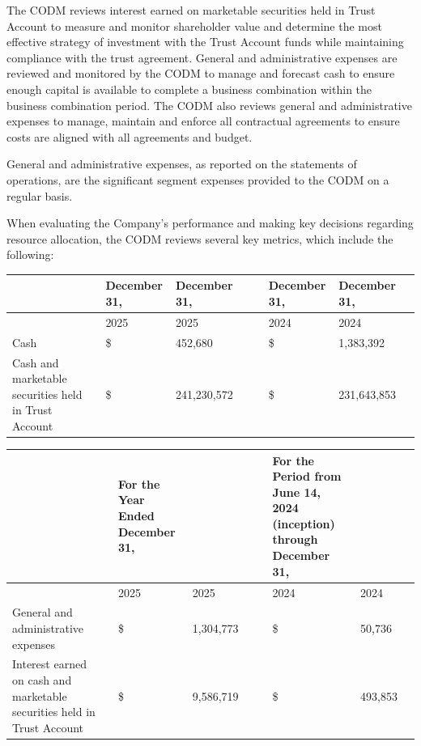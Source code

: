 \documentclass[11pt,a4paper]{article}
\begin{document}
The CODM reviews interest earned on marketable securities held in Trust Account to measure and monitor shareholder value and determine the most effective strategy of investment with the Trust Account funds while maintaining compliance with the trust agreement. General and administrative expenses are reviewed and monitored by the CODM to manage and forecast cash to ensure enough capital is available to complete a business combination within the business combination period. The CODM also reviews general and administrative expenses to manage, maintain and enforce all contractual agreements to ensure costs are aligned with all agreements and budget.

General and administrative expenses, as reported on the statements of operations, are the significant segment expenses provided to the CODM on a regular basis.

When evaluating the Company's performance and making key decisions regarding resource allocation, the CODM reviews several key metrics, which include the following:

\begin{table}[h]
\begin{tabular}{|l|l|l|l|l|l|l|l|l|}
\hline
 &  & December 31, & December 31, &  &  & December 31, & December 31, &  \\ \hline
 &  & 2025 & 2025 &  &  & 2024 & 2024 &  \\ \hline
Cash &  & \$ & 452,680 &  &  & \$ & 1,383,392 &  \\ \hline
Cash and marketable securities held in Trust Account &  & \$ & 241,230,572 &  &  & \$ & 231,643,853 &  \\ \hline
\end{tabular}
\end{table}

\begin{table}[h]
\begin{tabular}{|l|l|l|l|l|l|l|l|l|}
\hline
 &  & For the Year Ended December 31, &  &  &  & For the Period from June 14, 2024 (inception) through December 31, &  &  \\ \hline
 &  & 2025 & 2025 &  &  & 2024 & 2024 &  \\ \hline
General and administrative expenses &  & \$ & 1,304,773 &  &  & \$ & 50,736 &  \\ \hline
Interest earned on cash and marketable securities held in Trust Account &  & \$ & 9,586,719 &  &  & \$ & 493,853 &  \\ \hline
\end{tabular}
\end{table}
\end{document}
